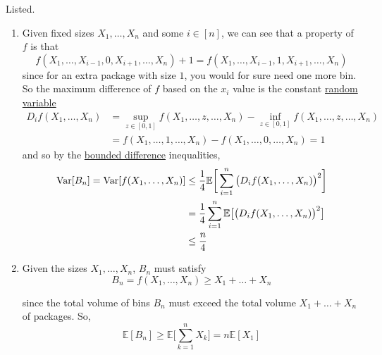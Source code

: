   \begin{solution}
  Listed. 
  \begin{enumerate}
      \item Given fixed sizes $X_1, \ldots, X_n$ and some $i \in [n]$, we can see that a property of $f$ is that 
      \begin{equation}
        f(X_1, \ldots, X_{i-1}, 0, X_{i+1}, \ldots, X_n) + 1 = f(X_1, \ldots, X_{i-1}, 1, X_{i+1}, \ldots, X_n)
      \end{equation}
      since for an extra package with size $1$, you would for sure need one more bin. So the maximum difference of $f$ based on the $x_i$ value is the constant \hyperref[prob-def:random-variable]{random variable} 
      \begin{align*}
          D_i f(X_1, \ldots, X_n) & = \sup_{z \in [0, 1]} f(X_1, \ldots, z, \ldots, X_n) - \inf_{z \in [0, 1]} f(X_1, \ldots, z, \ldots, X_n)\\
          & = f(X_1, \ldots, 1, \ldots, X_n) - f(X_1, \ldots, 0, \ldots, X_n) = 1
      \end{align*}
      and so by the \hyperref[prob-thm:bounded-difference-inequality]{bounded difference} inequalities, 
      \begin{align*}
          \operatorname{Var}[B_n] = \operatorname{Var}[f(X_1, \ldots, X_n)] & \leq \frac{1}{4} \mathbb{E} \bigg[ \sum_{i=1}^n \big( D_i f(X_1, \ldots, X_n) \big)^2 \bigg] \\
          & = \frac{1}{4} \sum_{i=1}^n \mathbb{E} \big[ \big( D_i f(X_1, \ldots, X_n) \big)^2 \big] \\
          & \leq \frac{n}{4} 
      \end{align*}
      \item Given the sizes $X_1, \ldots, X_n$, $B_n$ must satisfy 
      \begin{equation}
        B_n = f(X_1, \ldots, X_n) \geq X_1 + \ldots + X_n
      \end{equation}
       
      since the total volume of bins $B_n$ must exceed the total volume $X_1 + \ldots + X_n$ of packages. So, 
      \begin{equation}
        \mathbb{E}[B_n] \geq \mathbb{E}\bigg[ \sum_{k=1}^n X_k \bigg] = n \mathbb{E}[X_1]
      \end{equation}
  \end{enumerate}
  \end{solution}

